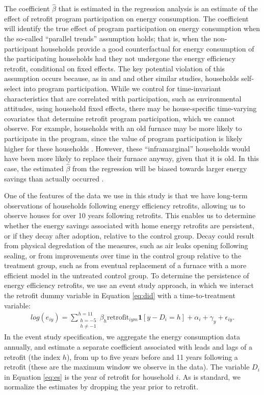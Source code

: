 \documentclass{article}
\begin{document}
The coefficient $\hat{\beta}$ that is estimated in the regression analysis is an estimate of the effect of retrofit program participation on energy consumption. The coefficient will identify the true effect of program participation on energy consumption when the so-called ``parallel trends'' assumption holds; that is, when the non-participant households provide a good counterfactual for energy consumption of the participating households had they not undergone the energy efficiency retrofit, conditional on fixed effects. The key potential violation of this assumption occurs because, as in \cite{liang2018energy} and \cite{chuang2022residential} and other similar studies, households self-select into program participation. While we control for time-invariant characteristics that are correlated with participation, such as environmental attitudes, using household fixed effects, there may be house-specific time-varying covariates that determine retrofit program participation, which we cannot observe. For example, households with an old furnace may be more likely to participate in the program, since the value of program participation is likely higher for these households \citep{rivers2016free}. However, these ``inframarginal'' households would have been more likely to replace their furnace anyway, given that it is old. In this case, the estimated $\hat{\beta}$ from the regression will be biased towards larger energy savings than actually occurred \citep{boomhower2014credible}.

One of the features of the data we use in this study is that we have long-term observations of households following energy efficiency retrofits, allowing us to observe houses for over 10 years following retrofits. This enables us to determine whether the energy savings associated with home energy retrofits are persistent, or if they decay after adoption, relative to the control group. Decay could result from physical degredation of the measures, such as air leaks opening following sealing, or from improvements over time in the control group relative to the treatment group, such as from eventual replacement of a furnace with a more efficient model in the untreated control group. To determine the persistence of energy efficiency retrofits, we use an event study approach, in which we interact the retrofit dummy variable in Equation \eqref{eq:did} with a time-to-treatment variable:
\begin{align}
	log(e_{iy}) = \sum\limits_{\substack{h=-5 \\ h\neq -1}}^{h=11}  \beta_h \text{retrofit}_{iym}\bm{1}[y - D_i = h] + \alpha_i + \gamma_{y} + \epsilon_{iy}.
	\label{eq:es}
\end{align}
In the event study specification, we aggregate the energy consumption data annually, and estimate a separate coefficient associated with leads and lags of a retrofit (the index $h$), from up to five years before and 11 years following a retrofit (these are the maximum window we observe in the data). The variable $D_i$ in Equation \eqref{eq:es} is the year of retrofit for household $i$. As is standard, we normalize the estimates by dropping the year prior to retrofit.
\end{document}
